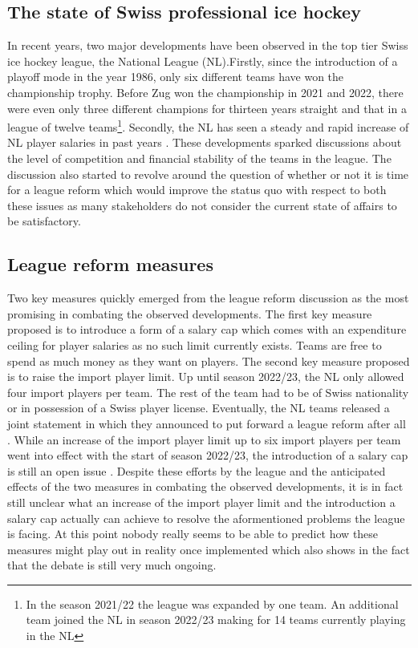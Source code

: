 \documentclass[12pt, a4paper]{article}
\begin{document}
\setlength{\parskip}{\baselineskip}  %

\subsection{The state of Swiss professional ice hockey}

In recent years, two major developments have been observed in the top tier Swiss ice hockey league, the National League (NL).Firstly, since the introduction of a playoff mode in the year 1986, only six different teams have won the championship trophy. Before Zug won the championship in 2021 and 2022, there were even only three different champions for thirteen years straight and that in a league of twelve teams\footnote{In the season 2021/22 the league was expanded by one team. An additional team joined the NL in season 2022/23 making for 14 teams currently playing in the NL}. Secondly, the NL has seen a steady and rapid increase of NL player salaries in past years \citep[see][]{germann_spielerlohne_2020,roth_zsc-boss_2018}. These developments sparked discussions about the level of competition and financial stability of the teams in the league. The discussion also started to revolve around the question of whether or not it is time for a league reform which would improve the status quo with respect to both these issues as many stakeholders do not consider the current state of affairs to be satisfactory. 

\subsection{League reform measures}

 Two key measures quickly emerged from the league reform discussion as the most promising in combating the observed developments. The first key measure proposed is to introduce a form of a salary cap which comes with an expenditure ceiling for player salaries as no such limit currently exists. Teams are free to spend as much money as they want on players. The second key measure proposed is to raise the import player limit. Up until season 2022/23, the NL only allowed four import players per team. The rest of the team had to be of Swiss nationality or in possession of a Swiss player license. Eventually, the NL teams released a joint statement in which they announced to put forward a league reform after all \citep[see][]{stettler_neu_2021}. While an increase of the import player limit up to six import players per team went into effect with the start of season 2022/23, the introduction of a salary cap is still an open issue \citep[see][]{germann_eishockeysaison_2021}. Despite these efforts by the league and the anticipated effects of the two measures in combating the observed developments, it is in fact still unclear what an increase of the import player limit and the introduction a salary cap actually can achieve to resolve the aformentioned problems the league is facing. At this point nobody really seems to be able to predict how these measures might play out in reality once implemented which also shows in the fact that the debate is still very much ongoing. 
 
\end{document}
